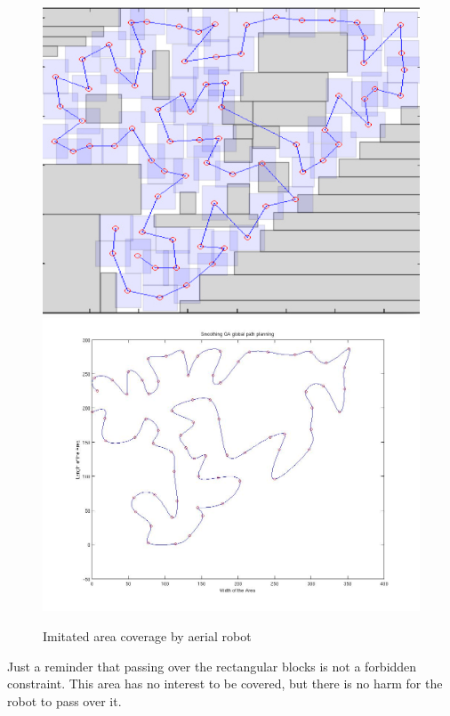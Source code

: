 \begin{figure}[H]
  \includegraphics[width=\linewidth]{figures/sattlite_linear.jpg}  
  \endminipage \hfill
  \includegraphics[width=\linewidth]{figures/outdoor_smooth.jpg}  
  \endminipage
  \caption{Imitated area coverage by aerial robot }
  \label{fig:satallite_linear_1}
\end{figure}

Just a reminder that passing over the rectangular blocks is not a forbidden constraint. This area has no interest to be covered, but there is no harm for the robot to pass over it.



